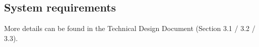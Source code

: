 \subsection{System requirements}
More details can be found in the Technical Design Document (Section 3.1 / 3.2 / 3.3).

\pagebreak